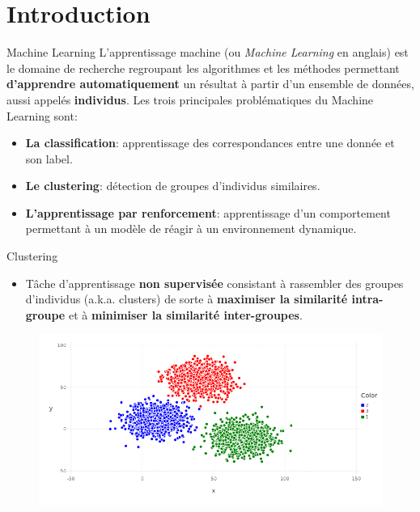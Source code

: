 \documentclass[hyperref={pdfpagelabels=false}]{beamer}
\begin{document}
    \section{Introduction}
    \begin{frame}{Machine Learning}
        L'apprentissage machine (ou \textit{Machine Learning} en anglais) est le 
        domaine de recherche regroupant les algorithmes et les méthodes 
        permettant \textbf{d'apprendre automatiquement} un résultat à partir 
        d'un ensemble de données, aussi appelés \textbf{individus}.
        Les trois principales problématiques du Machine Learning sont:
        \begin{itemize}
            \item<2-> {\textbf{La classification}: 
                    apprentissage des correspondances entre une donnée et son 
                label.}
            \item<3-> \textbf{Le clustering}: détection de groupes d'individus 
                similaires.
            \item<4-> {\textbf{L'apprentissage par 
                renforcement}: apprentissage d'un comportement permettant à un 
            modèle de réagir à un environnement dynamique.}
        \end{itemize}
    \end{frame}

    \begin{frame}{Clustering}
        \begin{itemize}
            \item Tâche d'apprentissage \textbf{non supervisée} consistant à 
                rassembler des groupes d'individus (a.k.a. clusters) de sorte à 
                \textbf{maximiser la similarité intra-groupe} et à 
                \textbf{minimiser la similarité inter-groupes}.
        \end{itemize}

        \begin{figure}[b]
            \centering
            \includegraphics[scale=.25]{clustering}
        \end{figure}
    \end{frame}
\end{document}
